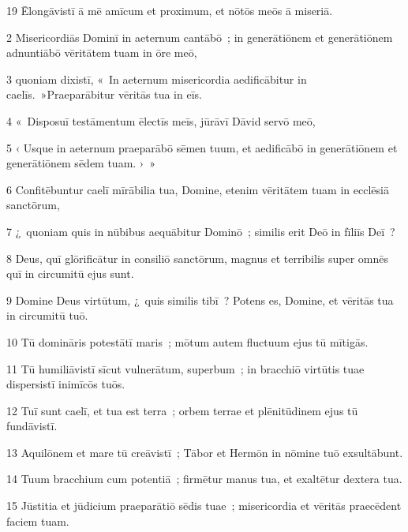 \psalmVerse
  {\phantom{0}19}
  {Ēlongāvistī ā mē amīcum et proximum, et nōtōs meōs ā miseriā.}




\psalmVerse
  {\phantom{00}2}
  {Misericordiās Dominī in aeternum cantābō~; in generātiōnem et generātiōnem adnuntiābō vēritātem tuam in ōre meō,}


\psalmVerse
  {\phantom{00}3}
  {quoniam dixistī, «~In aeternum misericordia aedificābitur in caelīs.~»Praeparābitur vēritās tua in eīs.}


\psalmVerse
  {\phantom{00}4}
  {«~Disposuī testāmentum ēlectīs meīs, jūrāvī Dāvid servō meō,}


\psalmVerse
  {\phantom{00}5}
  {‹ Usque in aeternum praeparābō sēmen tuum, et aedificābō in generātiōnem et generātiōnem sēdem tuam. ›~»}


\psalmVerse
  {\phantom{00}6}
  {Confitēbuntur caelī mīrābilia tua, Domine, etenim vēritātem tuam in ecclēsiā sanctōrum,}


\psalmVerse
  {\phantom{00}7}
  {¿~quoniam quis in nūbibus aequābitur Dominō~; similis erit Deō in fīliīs Deī~?}


\psalmVerse
  {\phantom{00}8}
  {Deus, quī glōrificātur in consiliō sanctōrum, magnus et terribilis super omnēs quī in circumitū ejus sunt.}


\psalmVerse
  {\phantom{00}9}
  {Domine Deus virtūtum, ¿~quis similis tibī~? Potens es, Domine, et vēritās tua in circumitū tuō.}


\psalmVerse
  {\phantom{0}10}
  {Tū domināris potestātī maris~; mōtum autem fluctuum ejus tū mītigās.}


\psalmVerse
  {\phantom{0}11}
  {Tū humiliāvistī sīcut vulnerātum, superbum~; in bracchiō virtūtis tuae dispersistī inimīcōs tuōs.}


\psalmVerse
  {\phantom{0}12}
  {Tuī sunt caelī, et tua est terra~; orbem terrae et plēnitūdinem ejus tū fundāvistī.}


\psalmVerse
  {\phantom{0}13}
  {Aquilōnem et mare tū creāvistī~; Tābor et Hermōn in nōmine tuō exsultābunt.}


\psalmVerse
  {\phantom{0}14}
  {Tuum bracchium cum potentiā~; firmētur manus tua, et exaltētur dextera tua.}


\psalmVerse
  {\phantom{0}15}
  {Jūstitia et jūdicium praeparātiō sēdis tuae~; misericordia et vēritās praecēdent faciem tuam.}


